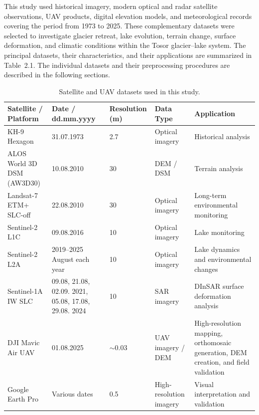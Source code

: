 \documentclass[12pt,a4paper]{report}
\begin{document}
This study used historical imagery, modern optical and radar satellite observations, UAV products, digital elevation models, and meteorological records covering the period from 1973 to 2025. These complementary datasets were selected to investigate glacier retreat, lake evolution, terrain change, surface deformation, and climatic conditions within the Tosor glacier--lake system. The principal datasets, their characteristics, and their applications are summarized in Table~2.1. The individual datasets and their preprocessing procedures are described in the following sections.

\begin{landscape}

\begin{table}[p]
\centering
\caption{Satellite and UAV datasets used in this study.}
\label{tab:datasets}

\small

\begin{tabularx}{\linewidth}{|p{4cm}|p{2.5cm}|p{2cm}|p{3cm}|X|}
\hline
\textbf{Satellite / Platform} &
\textbf{Date / dd.mm.yyyy} &
\textbf{Resolution (m)} &
\textbf{Data Type} &
\textbf{Application} \\
\hline

KH-9 Hexagon &
31.07.1973 &
2.7 &
Optical imagery &
Historical analysis \\
\hline

ALOS World 3D DSM (AW3D30) &
10.08.2010 &
30 &
DEM / DSM &
Terrain analysis \\
\hline

Landsat-7 ETM+ SLC-off &
22.08.2010 &
30 &
Optical imagery &
Long-term environmental monitoring \\
\hline

Sentinel-2 L1C &
09.08.2016 &
10 &
Optical imagery &
Lake monitoring \\
\hline

Sentinel-2 L2A &
2019--2025 August each year &
10 &
Optical imagery &
Lake dynamics and environmental changes \\
\hline

Sentinel-1A IW SLC &
09.08, 21.08, 02.09. 2021, 05.08, 17.08, 29.08. 2024 &
10 &
SAR imagery &
DInSAR surface deformation analysis \\
\hline

DJI Mavic Air UAV &
01.08.2025 &
$\sim$0.03 &
UAV imagery / DEM &
High-resolution mapping, orthomosaic generation, DEM creation, and field validation \\
\hline

Google Earth Pro &
Various dates &
0.5 &
High-resolution imagery &
Visual interpretation and validation \\
\hline

\end{tabularx}

\end{table}

\end{landscape}
\end{document}
